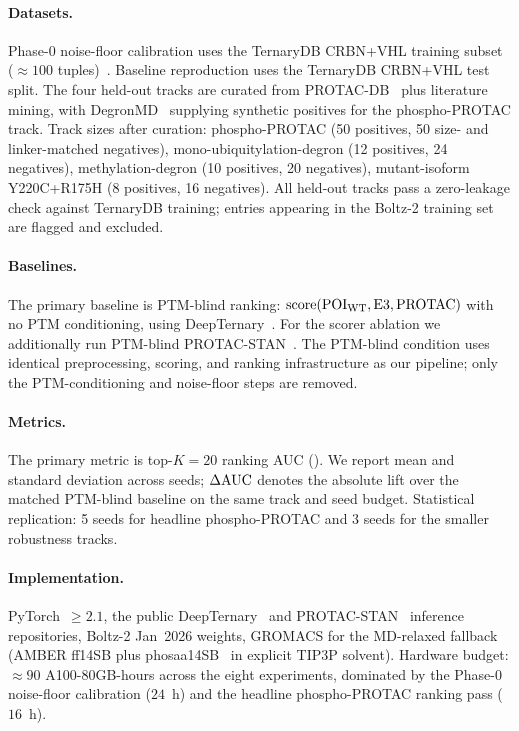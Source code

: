 \paragraph{Datasets.} Phase-0 noise-floor calibration uses the TernaryDB CRBN+VHL training subset ($\approx 100$ tuples)~\cite{deepternary-2025}. Baseline reproduction uses the TernaryDB CRBN+VHL test split. The four held-out tracks are curated from PROTAC-DB~\cite{protacdb-2024} plus literature mining, with DegronMD~\cite{degronmd-2024} supplying synthetic positives for the phospho-PROTAC track. Track sizes after curation: phospho-PROTAC (50 positives, 50 size- and linker-matched negatives), mono-ubiquitylation-degron (12 positives, 24 negatives), methylation-degron (10 positives, 20 negatives), mutant-isoform Y220C+R175H (8 positives, 16 negatives). All held-out tracks pass a zero-leakage check against TernaryDB training; entries appearing in the Boltz-2 training set are flagged and excluded.

\paragraph{Baselines.} The primary baseline is PTM-blind ranking: $\mathrm{score}(\mathrm{POI}_{\mathrm{WT}},\mathrm{E3},\mathrm{PROTAC})$ with no PTM conditioning, using DeepTernary~\cite{deepternary-2025}. For the scorer ablation we additionally run PTM-blind PROTAC-STAN~\cite{protac-stan-2025}. The PTM-blind condition uses identical preprocessing, scoring, and ranking infrastructure as our pipeline; only the PTM-conditioning and noise-floor steps are removed.

\paragraph{Metrics.} The primary metric is top-$K{=}20$ ranking AUC (\aucK). We report mean and standard deviation across seeds; $\Delta\mathrm{AUC}$ denotes the absolute lift over the matched PTM-blind baseline on the same track and seed budget. Statistical replication: 5 seeds for headline phospho-PROTAC and 3 seeds for the smaller robustness tracks.

\paragraph{Implementation.} PyTorch~$\geq 2.1$, the public DeepTernary~\cite{deepternary-2025} and PROTAC-STAN~\cite{protac-stan-2025} inference repositories, Boltz-2 Jan~2026 weights, GROMACS for the MD-relaxed fallback (AMBER ff14SB plus phosaa14SB~\cite{phosaa14sb-2013} in explicit TIP3P solvent). Hardware budget: $\approx 90$ A100-80GB-hours across the eight experiments, dominated by the Phase-0 noise-floor calibration ($24$~h) and the headline phospho-PROTAC ranking pass ($16$~h).

